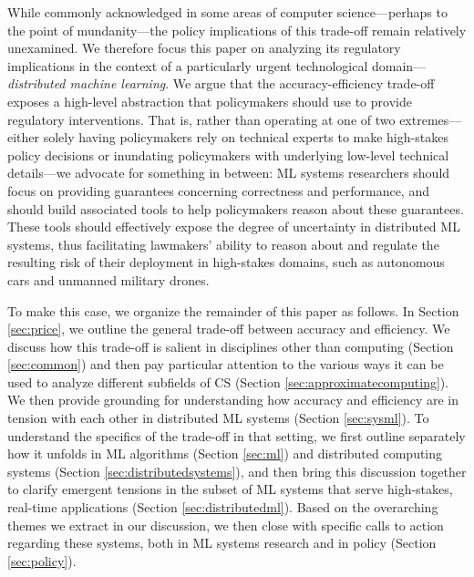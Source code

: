 \documentclass[sigplan,screen]{acmart}
\begin{document}
While commonly acknowledged in some areas of computer science---perhaps to the point of mundanity---the policy implications of this trade-off remain relatively unexamined. We therefore focus this paper on analyzing its regulatory implications in the context of a particularly urgent technological domain---\emph{distributed machine learning}. We argue that the accuracy-efficiency trade-off exposes a high-level abstraction that policymakers should use to provide regulatory interventions. That is, rather than operating at one of two extremes---either solely having policymakers rely on technical experts to make high-stakes policy decisions or inundating policymakers with underlying low-level technical details---we advocate for something in between: ML systems researchers should focus on providing guarantees concerning correctness and performance, and should build associated tools to help policymakers reason about these guarantees. These tools should effectively expose the degree of uncertainty in distributed ML systems, thus facilitating lawmakers' ability to reason about and regulate the resulting risk of their deployment in high-stakes domains, such as autonomous cars and unmanned military drones.  

To make this case, we organize the remainder of this paper as follows. In Section \ref{sec:price}, we outline the general trade-off between accuracy and efficiency. We discuss how this trade-off is salient in disciplines other than computing (Section \ref{sec:common}) and then pay particular attention to the various ways it can be used to analyze different subfields of CS (Section \ref{sec:approximatecomputing}). We then provide grounding for understanding how accuracy and efficiency are in tension with each other in distributed ML systems (Section \ref{sec:sysml}). To understand the specifics of the trade-off in that setting, we first outline separately how it unfolds in ML algorithms (Section \ref{sec:ml}) and distributed computing systems (Section \ref{sec:distributedsystems}), and then bring this discussion together to clarify emergent tensions in the subset of ML systems that serve high-stakes, real-time applications (Section \ref{sec:distributedml}). Based on the overarching themes we extract in our discussion, we then close with specific calls to action regarding these systems, both in ML systems research and in policy (Section \ref{sec:policy}).
\end{document}

